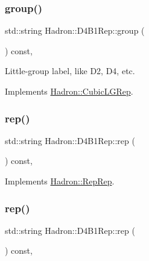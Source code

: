 \subsubsection{\texorpdfstring{group()}{group()}\hspace{0.1cm}{\footnotesize\ttfamily [3/3]}}
{\footnotesize\ttfamily std\+::string Hadron\+::\+D4\+B1\+Rep\+::group (\begin{DoxyParamCaption}{ }\end{DoxyParamCaption}) const\hspace{0.3cm}{\ttfamily [inline]}, {\ttfamily [virtual]}}

Little-\/group label, like D2, D4, etc. 

Implements \mbox{\hyperlink{structHadron_1_1CubicLGRep_a9bdb14b519a611d21379ed96a3a9eb41}{Hadron\+::\+Cubic\+L\+G\+Rep}}.

\mbox{\label{structHadron_1_1D4B1Rep_a516f90b12897aaf51c240310d9183687}} 
\subsubsection{\texorpdfstring{rep()}{rep()}\hspace{0.1cm}{\footnotesize\ttfamily [1/3]}}
{\footnotesize\ttfamily std\+::string Hadron\+::\+D4\+B1\+Rep\+::rep (\begin{DoxyParamCaption}{ }\end{DoxyParamCaption}) const\hspace{0.3cm}{\ttfamily [inline]}, {\ttfamily [virtual]}}



Implements \mbox{\hyperlink{structHadron_1_1RepRep_ab3213025f6de249f7095892109575fde}{Hadron\+::\+Rep\+Rep}}.

\mbox{\label{structHadron_1_1D4B1Rep_a516f90b12897aaf51c240310d9183687}} 
\subsubsection{\texorpdfstring{rep()}{rep()}\hspace{0.1cm}{\footnotesize\ttfamily [2/3]}}
{\footnotesize\ttfamily std\+::string Hadron\+::\+D4\+B1\+Rep\+::rep (\begin{DoxyParamCaption}{ }\end{DoxyParamCaption}) const\hspace{0.3cm}{\ttfamily [inline]}, {\ttfamily [virtual]}}



